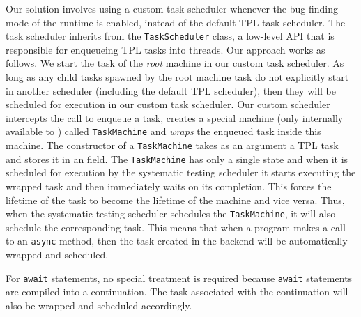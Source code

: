 Our solution involves using a custom task scheduler whenever the bug-finding mode of the \psharp runtime is enabled, instead of the default TPL task scheduler. The \psharp task scheduler inherits from the \texttt{TaskScheduler} class, a low-level API that is responsible for enqueueing TPL tasks into threads. Our approach works as follows. We start the task of the \emph{root} \psharp machine in our custom task scheduler. As long as any child tasks spawned by the root machine task do not explicitly start in another scheduler (including the default TPL scheduler), then they will be scheduled for execution in our custom task scheduler. Our custom scheduler intercepts the call to enqueue a task, creates a special machine (only internally available to \psharp) called \texttt{TaskMachine} and \emph{wraps} the enqueued task inside this machine. The constructor of a \texttt{TaskMachine} takes as an argument a TPL task and stores it in an field. The \texttt{TaskMachine} has only a single state and when it is scheduled for execution by the \psharp systematic testing scheduler it starts executing the wrapped task and then immediately waits on its completion. This forces the lifetime of the task to become the lifetime of the machine and vice versa. Thus, when the \psharp systematic testing scheduler schedules the \texttt{TaskMachine}, it will also schedule the corresponding task. This means that when a \psharp program makes a call to an \texttt{async} method, then the task created in the backend will be automatically wrapped and scheduled.

For \texttt{await} statements, no special treatment is required because \texttt{await} statements are compiled into a continuation. The task associated with the continuation will also be wrapped and scheduled accordingly.
